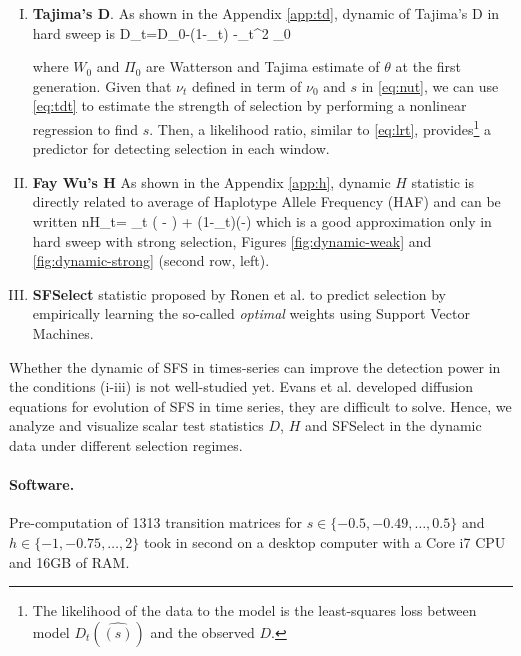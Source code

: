 \documentclass[11pt]{article}
\begin{document}
\begin{enumerate}[I.]
	\item {\bf Tajima's D}. As shown in the Appendix \ref{app:td}, dynamic of 
	Tajima's D in hard sweep is
	\beq
	D_t=D_0-\log(1-\nu_t)  -\nu_t^2 \Pi_0\label{eq:tdt}
	\eeq
	
	where $W_0$ and $\Pi_0$ are Watterson and Tajima estimate 
	of $\theta$ at 
	the first generation.
	Given that $\nu_t$ defined in term of $\nu_0$ and $s$ in 
	\eqref{eq:nut}, we 
	can use \eqref{eq:tdt} to estimate the strength of 
	selection by performing a nonlinear 
	regression to find 
	$s$. Then, a likelihood ratio, similar to \eqref{eq:lrt}, 
	provides\footnote{The 
		likelihood of the data to the model is the least-squares 
		loss between model 
		$D_t(\hat{(s)})$ and the observed $D$.} a predictor for 
	detecting selection in each window. 
	
	
	
	\item {\bf Fay Wu's H} As shown in the Appendix \ref{app:h}, dynamic $H$ 
	statistic is directly related to average of Haplotype Allele Frequency 
	(HAF) \cite{ronen2015predicting} and 
	can be written
	\beq
	nH_t= \theta \nu_t \left( - \right) +
	\theta (1-\nu_t)\left(-\right) 
	\label{eq:ht}
	\eeq
	which is a good approximation only in hard sweep with strong selection, 
	Figures 
	\ref{fig:dynamic-weak} and \ref{fig:dynamic-strong} (second
	row, left). 
	

	
	\item {\bf SFSelect} statistic proposed by Ronen et 
	al. \cite{ronen2013learning} to predict selection by empirically learning 
	the so-called \emph{optimal} weights using Support Vector Machines. 
\end{enumerate}

Whether the dynamic of SFS in times-series can improve the detection power in 
the conditions (i-iii) is not well-studied yet. Evans et al. 
\cite{evans2007non} developed diffusion equations for 
evolution of SFS in time series, they are difficult to solve. 
Hence, we analyze and visualize scalar test statistics $D$, $H$ and SFSelect 
in the dynamic data under different selection regimes.

\paragraph{Software.}
Pre-computation of 1313 transition matrices for $s\in\{-0.5,-0.49,\ldots,0.5 \}$ and $h\in \{-1,-0.75,\ldots,2\}$ took in second on a desktop computer with a Core i7 CPU and 16GB of RAM.
\end{document}
